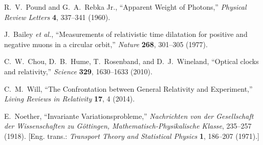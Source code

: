 \documentclass[12pt]{article}
\theoremstyle{plain} %
\begin{document}
\begin{thebibliography}{99}
R.~V.~Pound and G.~A.~Rebka Jr.,
``Apparent Weight of Photons,''
\emph{Physical Review Letters} \textbf{4}, 337--341 (1960).

J.~Bailey \emph{et al.},
``Measurements of relativistic time dilatation for positive and negative muons in a circular orbit,''
\emph{Nature} \textbf{268}, 301--305 (1977).

C.~W.~Chou, D.~B.~Hume, T.~Rosenband, and D.~J.~Wineland,
``Optical clocks and relativity,''
\emph{Science} \textbf{329}, 1630--1633 (2010).

C.~M.~Will,
``The Confrontation between General Relativity and Experiment,''
\emph{Living Reviews in Relativity} \textbf{17}, 4 (2014).

E.~Noether,
``Invariante Variationsprobleme,''
\emph{Nachrichten von der Gesellschaft der Wissenschaften zu G\"ottingen, Mathematisch-Physikalische Klasse}, 235--257 (1918).
[Eng. trans.: \emph{Transport Theory and Statistical Physics} \textbf{1}, 186--207 (1971).]

\end{thebibliography}
\end{document}

